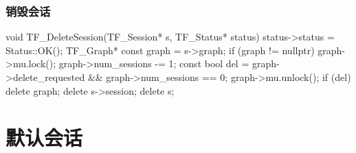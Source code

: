 \begin{content}
\subsubsection{销毁会话}

\begin{leftbar}
\begin{c++}
void TF_DeleteSession(TF_Session* s, TF_Status* status) {
  status->status = Status::OK();
  TF_Graph* const graph = s->graph;
  if (graph != nullptr) {
    graph->mu.lock();
    graph->num_sessions -= 1;
    const bool del = graph->delete_requested && graph->num_sessions == 0;
    graph->mu.unlock();
    if (del) delete graph;
  }
  delete s->session;
  delete s;
}
\end{c++}
\end{leftbar}

\end{content}

\section{默认会话}

